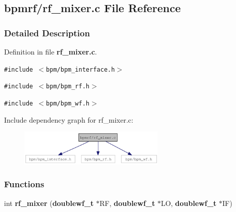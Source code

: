 \subsection{bpmrf/rf\_\-mixer.c File Reference}
\label{rf__mixer_8c}


\subsubsection{Detailed Description}


Definition in file {\bf rf\_\-mixer.c}.

{\tt \#include $<$bpm/bpm\_\-interface.h$>$}\par
{\tt \#include $<$bpm/bpm\_\-rf.h$>$}\par
{\tt \#include $<$bpm/bpm\_\-wf.h$>$}\par


Include dependency graph for rf\_\-mixer.c:\nopagebreak
\begin{figure}[H]
\begin{center}
\leavevmode
\includegraphics[width=198pt]{rf__mixer_8c__incl}
\end{center}
\end{figure}
\subsubsection*{Functions}
\begin{CompactItemize}
\item 
int {\bf rf\_\-mixer} ({\bf doublewf\_\-t} $\ast$RF, {\bf doublewf\_\-t} $\ast$LO, {\bf doublewf\_\-t} $\ast$IF)
\end{CompactItemize}

